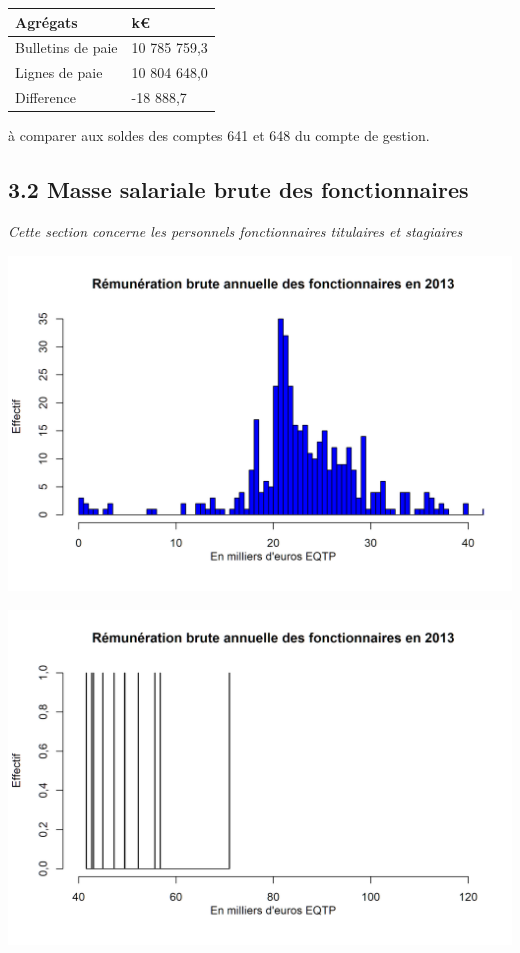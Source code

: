 \begin{longtable}[]{@{}ll@{}}
\toprule
Agrégats & k€\tabularnewline
\midrule
\endhead
Bulletins de paie & 10 785 759,3\tabularnewline
Lignes de paie & 10 804 648,0\tabularnewline
Difference & -18 888,7\tabularnewline
\bottomrule
\end{longtable}

à comparer aux soldes des comptes 641 et 648 du compte de gestion.

\hypertarget{masse-salariale-brute-des-fonctionnaires-1}{%
\subsection{3.2 Masse salariale brute des
fonctionnaires}\label{masse-salariale-brute-des-fonctionnaires-1}}

\emph{Cette section concerne les personnels fonctionnaires titulaires et
stagiaires}

\includegraphics{altair_files/figure-latex/unnamed-chunk-76-1.png}

\includegraphics{altair_files/figure-latex/unnamed-chunk-76-2.png}

